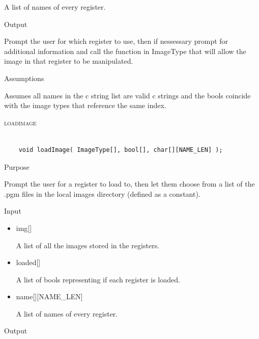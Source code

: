 \documentclass[pdftex, 11pt]{article}
\begin{document}
\begin{description}
\begin{description}
\begin{itemize}
						A list of names of every register.

				\end{itemize}

			\item{Output}

				Prompt the user for which register to use, then if nessessary
				prompt for additional information and call the function
				in ImageType that will allow the image in that register to
				be manipulated.

			\item{Assumptions}

				Assumes all names in the c string list are valid c
				strings and the bools coincide with the image types that
				reference the same index.

		\end{description}



	\item{\textsc{loadimage}}

		\begin{lstlisting}

	void loadImage( ImageType[], bool[], char[][NAME_LEN] );
		\end{lstlisting}

		\begin{description}
			\item{Purpose}

				Prompt the user for a register to load to, then let them choose from a list
				of the .pgm files in the local images directory (defined as a constant).

			\item{Input}

				\begin{itemize}

					\item{img[]}

						A list of all the images stored in the registers.

					\item{loaded[]}

						A list of bools representing if each register is loaded.

					\item{name[][NAME\_LEN]}

						A list of names of every register.

				\end{itemize}

			\item{Output}


\end{description}
\end{description}
\end{document}
